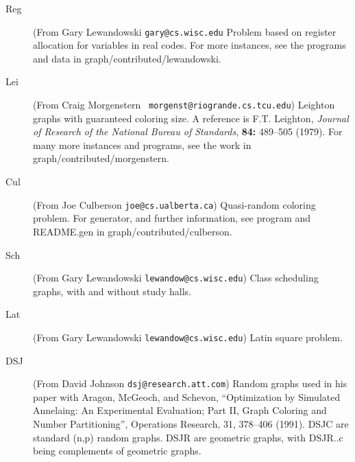 \begin{description}
\item[Reg] (From Gary Lewandowski {\tt gary@cs.wisc.edu} Problem based
on register allocation for variables in real codes.  For more
instances, see the programs and data in graph/contributed/lewandowski.

\item[Lei] (From Craig Morgenstern {\tt
morgenst@riogrande.cs.tcu.edu}) Leighton graphs with guaranteed
coloring size.  A reference is F.T. Leighton, {\it Journal of Research
of the National Bureau of Standards}, {\bf 84:} 489--505 (1979).  For
many more instances and programs, see the work in
graph/contributed/morgenstern.  

\item[Cul] (From Joe Culberson {\tt joe@cs.ualberta.ca}) Quasi-random
  coloring problem.  For generator, and further information, see
  program and README.gen in graph/contributed/culberson.

\item[Sch] (From Gary Lewandowski {\tt lewandow@cs.wisc.edu}) Class
  scheduling graphs, with and without study halls.

\item[Lat] (From Gary Lewandowski {\tt lewandow@cs.wisc.edu}) Latin
  square problem.

\item[DSJ] (From David Johnson {\tt dsj@research.att.com}) Random
graphs used in his paper with Aragon, McGeoch, and Schevon,
``Optimization by Simulated Annelaing:  An Experimental Evaluation;
Part II, Graph Coloring and Number Partitioning'', Operations
Research, 31, 378--406 (1991).  DSJC are standard (n,p) random graphs.
DSJR are geometric graphs, with DSJR..c being complements of geometric
graphs.

\end{description}


